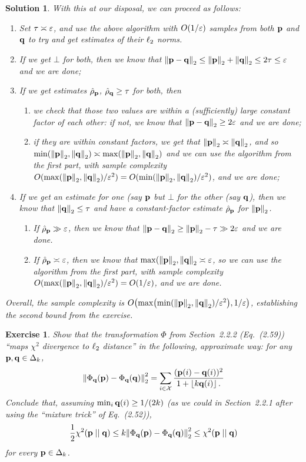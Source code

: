 \documentclass[biber]{nowfnt} %
\newtheorem{question}{Exercise}[chapter]
\newtheorem{solution}{Solution}[chapter]
\begin{document}
\begin{solution}
With this at our disposal, we can proceed as follows: 
\begin{enumerate}
	\item Set $\tau \asymp \dst$, and use the above algorithm with $\bigO{1/\dst}$ samples from both $\p$ and $\q$ to try and get estimates of their $\lp[2]$ norms. 
	\item If we get $\bot$ for both, then we know that $\normtwo{\p-\q} \leq \normtwo{\p}+\normtwo{\q} \leq 2\tau \leq \dst$ and we are done;
	\item If we get estimates $\hat{\rho}_{\p}$, $\hat{\rho}_{\q}\geq \tau$ for both, then 
		\begin{enumerate}
			\item we check that those two values are within a (sufficiently) large constant factor of each other: if not, we know that $\normtwo{\p-\q} \geq 2\dst$ and we are done;
			\item if they are within constant factors, we get that $\normtwo{\p}\asymp \normtwo{\q}$, and so $\min(\normtwo{\p},\normtwo{\q})\asymp \max(\normtwo{\p},\normtwo{\q})$ and we can use the algorithm from the first part, with sample complexity $O(\max\Paren{\normtwo{\p},\normtwo{\q}}/\dst^2)=O(\min\Paren{\normtwo{\p},\normtwo{\q}}/\dst^2)$, and we are done;
		\end{enumerate}
	\item If we get an estimate for one (say $\p$ but $\bot$ for the other (say $\q$), then we know that $\normtwo{\q} \leq \tau$ and have a constant-factor estimate $\hat{\rho}_{\p}$ for $\normtwo{\p}$. 
		\begin{enumerate}
				\item If $\hat{\rho}_{\p} \gg \dst$, then we know that $\normtwo{\p-\q} \geq \normtwo{\p}-\tau \gg 2\dst$ and we are done.
				\item If $\hat{\rho}_{\p} \asymp \dst$, then we know that $\max(\normtwo{\p},\normtwo{\q} \asymp \dst$, so we can use the algorithm from the first part, with sample complexity $O(\max\Paren{\normtwo{\p},\normtwo{\q}}/\dst^2) = O(1/\dst)$, and we are done.
		\end{enumerate}
\end{enumerate}
Overall, the sample complexity is $\bigO{\max\Paren{\min\Paren{\normtwo{\p},\normtwo{\q}}/\dst^2}, 1/\dst}$, establishing the second bound from the exercise.
\end{solution}
\begin{question}\label{ex:l2:reduction:chisquare}
Show that the transformation $\Phi$ from Section~2.2.2 (Eq.~(2.59)) ``maps $\chi^2$ divergence to $\lp[2]$ distance'' in the following, approximate way: for any $\p,\q\in\distribs{\ab}$, 
\[
	\normtwo{\Phi_\q(\p)-\Phi_\q(\q)}^2 = \sum_{i\in\domain}\frac{(\p(i)-\q(i))^2}{1+\flr{\ab\q(i)}\,.}
\]
Conclude that, assuming $\min_i \q(i) \geq 1/(2\ab)$ (as we could in Section~2.2.1 after using the ``mixture trick'' of Eq.~(2.52)), 
\[
	\frac{1}{2}\chisquare{\p}{\q}\leq \ab\normtwo{\Phi_\q(\p)-\Phi_\q(\q)}^2 \leq \chisquare{\p}{\q}
\]
for every $\p\in\distribs{\ab}$.
\end{question}
\end{document}
